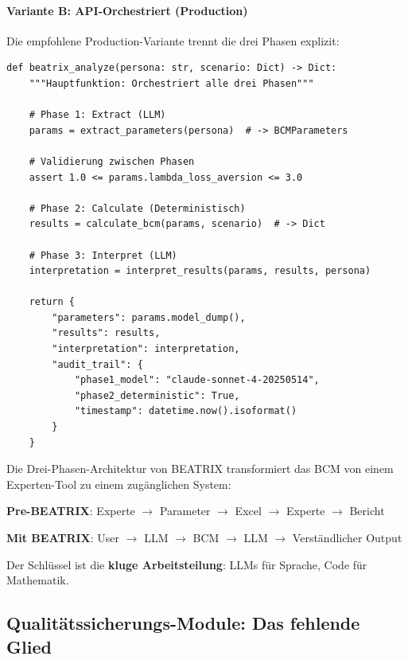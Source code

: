 \paragraph{Variante B: API-Orchestriert (Production)}

Die empfohlene Production-Variante trennt die drei Phasen explizit:

\begin{lstlisting}[caption={BEATRIX Orchestrator: Integration der drei Phasen}]
def beatrix_analyze(persona: str, scenario: Dict) -> Dict:
    """Hauptfunktion: Orchestriert alle drei Phasen"""

    # Phase 1: Extract (LLM)
    params = extract_parameters(persona)  # -> BCMParameters

    # Validierung zwischen Phasen
    assert 1.0 <= params.lambda_loss_aversion <= 3.0

    # Phase 2: Calculate (Deterministisch)
    results = calculate_bcm(params, scenario)  # -> Dict

    # Phase 3: Interpret (LLM)
    interpretation = interpret_results(params, results, persona)

    return {
        "parameters": params.model_dump(),
        "results": results,
        "interpretation": interpretation,
        "audit_trail": {
            "phase1_model": "claude-sonnet-4-20250514",
            "phase2_deterministic": True,
            "timestamp": datetime.now().isoformat()
        }
    }
\end{lstlisting}

\begin{tcolorbox}[colback=green!5!white, colframe=green!75!black, title=Schlussfolgerung]
Die Drei-Phasen-Architektur von BEATRIX transformiert das BCM von einem Experten-Tool zu einem zugänglichen System:

\textbf{Pre-BEATRIX}: Experte $\rightarrow$ Parameter $\rightarrow$ Excel $\rightarrow$ Experte $\rightarrow$ Bericht

\textbf{Mit BEATRIX}: User $\rightarrow$ LLM $\rightarrow$ BCM $\rightarrow$ LLM $\rightarrow$ Verständlicher Output

Der Schlüssel ist die \textbf{kluge Arbeitsteilung}: LLMs für Sprache, Code für Mathematik.
\end{tcolorbox}

\subsection{Qualitätssicherungs-Module: Das fehlende Glied}

